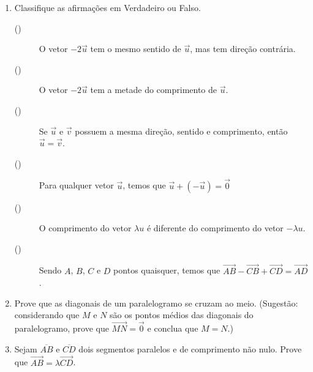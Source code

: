 \documentclass[12pt,a4paper]{article}
\begin{document}
\begin{enumerate}
  \item Classifique as afirmações em Verdadeiro ou Falso.
  
  \begin{description}
    \item[(\quad)] O vetor $-2\vec{u}$ tem o mesmo sentido de $\vec{u}$, mas tem 
      direção contrária.
    \item[(\quad)] O vetor $-2\vec{u}$ tem a metade do comprimento de $\vec{u}$.
    \item[(\quad)] Se $\vec{u}$ e $\vec{v}$ possuem a mesma direção, sentido e
      comprimento, então $\vec{u} = \vec{v}$.
    \item[(\quad)] Para qualquer vetor $\vec{u}$, temos que
      $\vec{u} + (-\vec{u}) = \vec{0}$
    \item[(\quad)] O comprimento do vetor $\lambda u$ é diferente do comprimento 
      do vetor $-\lambda u$.
    \item[(\quad)] Sendo $A$, $B$, $C$ e $D$ pontos quaisquer, temos que 
      $\overrightarrow{AB} - \overrightarrow{CB} + \overrightarrow{CD} = \overrightarrow{AD}$.
  \end{description}
  
  \item Prove que as diagonais de um paralelogramo se cruzam ao meio. (Sugestão:
    considerando que $M$ e $N$ são os pontos médios das diagonais do paralelogramo, 
    prove que $\overrightarrow{MN} = \vec{0}$ e conclua que $M = N$.)
    
  \item Sejam $\overline{AB}$ e $\overline{CD}$ dois segmentos paralelos e de
  comprimento não nulo. Prove que $\overrightarrow{AB} = \lambda\overrightarrow{CD}$.
  
\end{enumerate}
\end{document}
